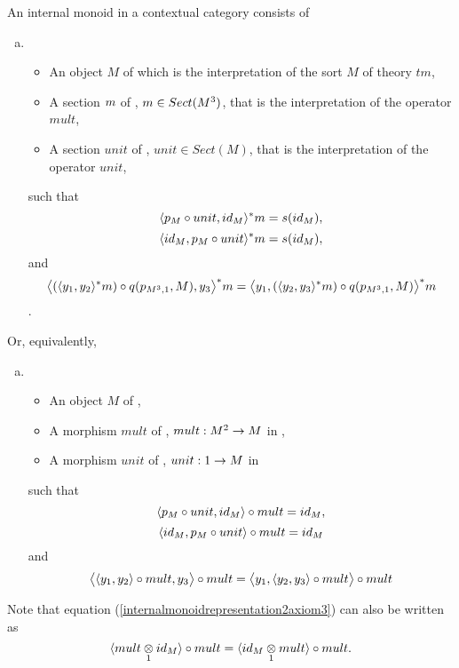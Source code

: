 \begin{lemma}
\label{internalmonoidlemma}
An internal monoid in a contextual category \catcw consists of
\begin{enumerate}[(a)]
\item 
\begin{itemize}
\item An object $M$ of \catcw which is the interpretation of the sort $M$ of theory $tm$,
\item A section $m$ of \catc, $m \in Sect(M^3)$, that is the interpretation of the operator $mult$,
\item A section $unit$ of \catc, $unit \in Sect(M)$, that is the interpretation of the operator $unit$,
\end{itemize}
such that
\begin{equation}
\label{internalmonoidrepresentation1axiom1}
\tuple{p_M \circ unit,id_M}^*\fmult=s(id_M),
\end{equation}
\begin{equation}
\label{internalmonoidrepresentation1axiom2}
\tuple{id_M,p_M \circ unit}^*\fmult=s(id_M),
\end{equation}
and
\begin{equation}
\label{internalmonoidrepresentation1axiom3}
\bigtuple{(\tuple{y_1,y_2}^*\fmult)\circ q(p_{M^3,1},M),y_3}^*\fmult
=\bigtuple{y_1,(\tuple{y_2,y_3}^*\fmult)\circ q(p_{M^3,1},M)}^*\fmult
\end{equation}.
\end{enumerate}
Or, equivalently, 
\begin{enumerate}[(b)]
\item
\begin{itemize}
\item An object $M$ of \catc,
\item A morphism $mult$ of \catc, $mult: M^2 \rightarrow M$ in \catc,
\item A morphism $unit$ of \catc, $unit: 1 \rightarrow M$ in \catc
\end{itemize}
such that
\begin{equation}
\label{internalmonoidrepresentation2axiom1}
\tuple{p_M \circ unit,id_M}\circ mult=id_M,
\end{equation}
\begin{equation}
\label{internalmonoidrepresentation2axiom2}
\tuple{{id_M,p_M \circ unit}}\circ mult=id_M
\end{equation}
and
\begin{equation}
\label{internalmonoidrepresentation2axiom3}
\bigtuple{\tuple{y_1,y_2}\circ mult,y_3}\circ mult
=\bigtuple{y_1,\tuple{y_2,y_3} \circ mult}\circ mult
\end{equation}
\end{enumerate}
Note that equation (\ref{internalmonoidrepresentation2axiom3})  can also be written as 
\begin{equation}
\label{internalmonoidrepresentation2axiom3rewritten}
\tuple{\crossx{mult}{id_M}{1}}\circ mult = \tuple{\crossx{id_M}{mult}{1}}\circ mult.
\end{equation}
\end{lemma}
